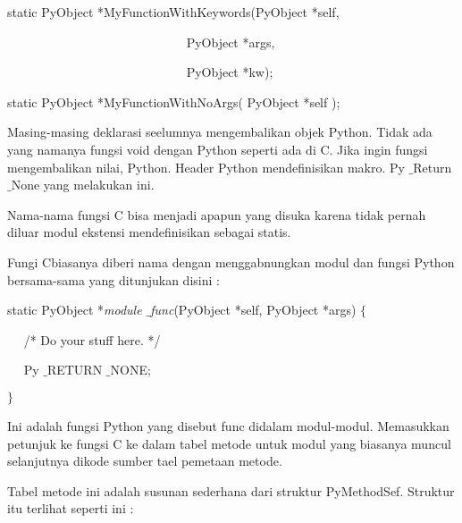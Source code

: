 \documentclass{wileySix}
\begin{document}
\begin{myEnumerate}
{\begin{myEnumerate}
\vspace{10pt}
\noindent 
{\fontsize{10pt}{10pt}\selectfont static PyObject *MyFunctionWithKeywords(PyObject *self,} \par
\noindent 
{\fontsize{10pt}{10pt}\selectfont ~~~~~~~~~~~~~~~~~~~~~~~~~~~~ PyObject *args,} \par
\noindent 
{\fontsize{10pt}{10pt}\selectfont ~~~~~~~~~~~~~~~~~~~~~~~~~~~~ PyObject *kw);} \par
\noindent 
\vspace{10pt}
\noindent 
{\fontsize{10pt}{10pt}\selectfont static PyObject *MyFunctionWithNoArgs( PyObject *self );} \par
\vspace{12pt}
\noindent 
\hspace*{0.5in} Masing-masing deklarasi seelumnya mengembalikan objek Python. Tidak ada yang namanya fungsi void dengan Python seperti ada di C. Jika ingin fungsi mengembalikan nilai, Python. Header Python mendefinisikan makro. Py $  \_  $Return $  \_  $None yang melakukan ini. \par
\noindent 
\hspace*{0.5in} Nama-nama fungsi C bisa menjadi apapun yang disuka karena tidak pernah diluar modul ekstensi mendefinisikan sebagai statis. \par
\noindent 
\hspace*{0.5in} Fungi Cbiasanya diberi nama dengan menggabnungkan modul dan fungsi Python bersama-sama yang ditunjukan disini : \par
\noindent 
static PyObject *\textit{module $  \_  $func}(PyObject *self, PyObject *args)  $  \{  $ \par
\noindent 
~~ /* Do your stuff here. */ \par
\noindent 
~~ Py $  \_  $RETURN $  \_  $NONE; \par
\noindent 
$  \}  $ \par
\vspace{12pt}
\vspace{12pt}
\noindent 
\hspace*{0.5in} Ini adalah fungsi Python yang disebut func didalam modul-modul. Memasukkan petunjuk ke fungsi C ke dalam tabel metode untuk modul yang biasanya muncul selanjutnya dikode sumber tael pemetaan metode. \par
\noindent 
\hspace*{0.5in} Tabel metode ini adalah susunan sederhana dari struktur PyMethodSef. Struktur itu terlihat seperti ini : \par
\noindent 

\end{myEnumerate}}
\end{myEnumerate}
\end{document}
